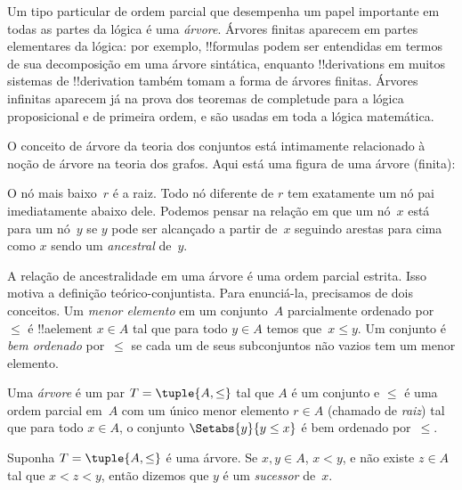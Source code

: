 \documentclass[../../../include/open-logic-section]{subfiles}
\begin{document}

Um tipo particular de ordem parcial que desempenha um papel importante em
todas as partes da lógica é uma \emph{árvore}. Árvores finitas aparecem em partes
elementares da lógica: por exemplo, !!{formula}s podem ser entendidas em termos
de sua decomposição em uma árvore sintática, enquanto !!{derivation}s em
muitos sistemas de !!{derivation} também tomam a forma de árvores finitas.
%
Árvores infinitas aparecem já na prova dos teoremas de completude
para a lógica proposicional e de primeira ordem, e são usadas
em toda a lógica matemática.

O conceito de árvore da teoria dos conjuntos está intimamente relacionado à noção
de árvore na teoria dos grafos. Aqui está uma figura de uma árvore (finita):

\begin{center}
\end{center}

O nó mais baixo~$r$ é a raiz. Todo nó diferente de $r$ tem
exatamente um nó pai imediatamente abaixo dele. Podemos pensar na relação
em que um nó~$x$ está para um nó~$y$ se $y$ pode ser alcançado a partir de~$x$
seguindo arestas para cima como $x$ sendo um \emph{ancestral} de~$y$.

A relação de ancestralidade em uma árvore é uma ordem parcial estrita. Isso
motiva a definição teórico-conjuntista. Para enunciá-la, precisamos de dois
conceitos. Um \emph{menor elemento} em um conjunto~$A$ parcialmente ordenado
por~$\le$ é !!a{element} $x \in A$ tal que para todo $y \in A$ temos
que~$x \le y$. Um conjunto é \emph{bem ordenado} por~$\le$ se cada um de
seus subconjuntos não vazios tem um menor elemento.

\begin{defn}[Árvore]
Uma \emph{árvore} é um par $T = \tuple{A, \le}$ tal que $A$ é um conjunto
e $\le$ é uma ordem parcial em~$A$ com um único menor elemento
$r \in A$ (chamado de \emph{raiz}) tal que para todo $x \in A$,
o conjunto $\Setabs{y}{y \le x}$ é bem ordenado por~$\le$.
\end{defn}

\begin{defn}[Sucessores]
Suponha $T = \tuple{A, \le}$ é uma árvore.
Se $x,y \in A$, $x < y$, e não existe $z \in A$ tal que
$x < z < y$, então dizemos que $y$ é um \emph{sucessor} de~$x$.
\end{defn}
\end{document}
